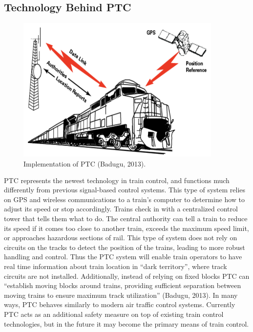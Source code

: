 \documentclass[11pt, titlepage]{article}
\begin{document}
\subsection{Technology Behind PTC}

\begin{figure}[h]
    \begin{center}
        \includegraphics[width=4in]{PTCDiagram.png}
        \caption{Implementation of PTC (Badugu, 2013).}
    \end{center}
\end{figure}

PTC represents the newest technology in train control, and functions much differently from previous signal-based control systems. This type of system relies on GPS and wireless communications to a train’s computer to determine how to adjust its speed or stop accordingly. Trains check in with a centralized control tower that tells them what to do. The central authority can tell a train to reduce its speed if it comes too close to another train, exceeds the maximum speed limit, or approaches hazardous sections of rail. This type of system does not rely on circuits on the tracks to detect the position of the trains, leading to more robust handling and control. Thus the PTC system will enable train operators to have real time information about train location in ``dark territory'', where track circuits are not installed. Additionally, instead of relying on fixed blocks PTC can ``establish moving blocks around trains, providing sufficient separation between moving trains to ensure maximum track utilization'' (Badugu, 2013). In many ways, PTC behaves similarly to modern air traffic control systems. Currently PTC acts as an additional safety measure on top of existing train control technologies, but in the future it may become the primary means of train control.
\end{document}
